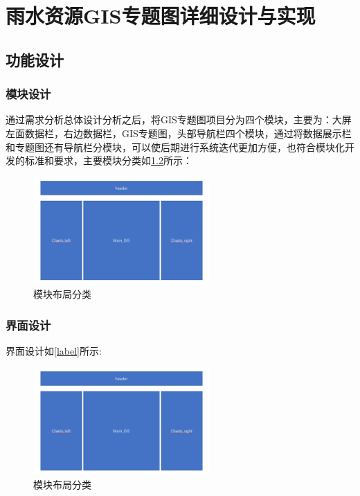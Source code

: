 
\chapter{雨水资源GIS专题图详细设计与实现}

\section{功能设计}

\subsection{模块设计}
通过需求分析总体设计分析之后，将GIS专题图项目分为四个模块，主要为：大屏左面数据栏，右边数据栏，GIS专题图，头部导航栏四个模块，通过将数据展示栏和专题图还有导航栏分模块，可以使后期进行系统迭代更加方便，也符合模块化开发的标准和要求，主要模块分类如\ref{fig:module}所示：

\begin{figure}[!htb]%
	\centering
	\includegraphics[width=0.60\textwidth]{figs/main.png}
	\caption{模块布局分类}
	\label{fig:module}
\end{figure}

\subsection{界面设计}
界面设计如\ref{label}所示:

\begin{figure}[!htb]%
	\centering
	\includegraphics[width=0.60\textwidth]{figs/main.png}
	\caption{模块布局分类}
	\label{fig:module}
\end{figure}


